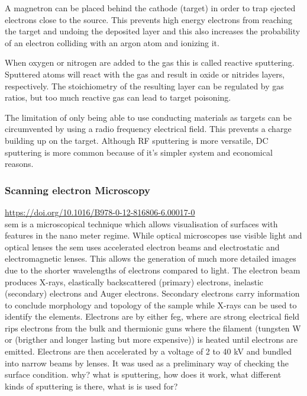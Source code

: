 A magnetron can be placed behind the cathode (target) in order to trap ejected electrons close to the source. 
This prevents high energy electrons from reaching the target and undoing the deposited layer and this also increases the probability of an electron colliding with an argon atom and ionizing it.

When oxygen or nitrogen are added to the  gas this is called reactive sputtering.
Sputtered atoms will react with the gas and result in oxide or nitrides layers, respectively.
The stoichiometry of the resulting layer can be regulated by gas ratios, but too much reactive gas can lead to target poisoning.

The limitation of only being able to use conducting materials as targets can be circumvented by using a radio frequency electrical field. 
This prevents a charge building up on the target. 
Although RF sputtering is more versatile, DC sputtering is more common because of it's simpler system and economical reasons.

\subsubsection{Scanning electron Microscopy}
\url{https://doi.org/10.1016/B978-0-12-816806-6.00017-0}\\
\Gls{sem} is a microscopical technique which allows visualisation of surfaces with features in the nano meter regime. 
While optical microscopes use visible light and optical lenses the \gls{sem} uses accelerated electron beams and electrostatic and electromagnetic lenses.
This allows the generation of much more detailed images due to the shorter wavelengths of electrons compared to light\cite{Kaliva2020}.
The electron beam produces X-rays, elastically backscattered (primary) electrons, inelastic (secondary) electrons and Auger electrons. 
Secondary electrons carry information to conclude morphology and topology of the sample while X-rays can be used to identify the elements. 
Electrons are  by either \gls{feg}, where are strong electrical field rips electrons from the bulk and thermionic guns where the filament (tungsten W or  (brigther and longer lasting but more expensive)) is heated until electrons are emitted. 
Electrons are then accelerated by a voltage of 2 to 40 kV and bundled into narrow beams\cite{Vernon2000} by lenses.
It was used as a preliminary way of checking the surface condition. 
why? 
what is sputtering, 
how does it work, 
what different kinds of sputtering is there, 
what is is used for? 
\cite{McMullan1995}
\cite{Vernon2000}
\cite{Kaliva2020}


